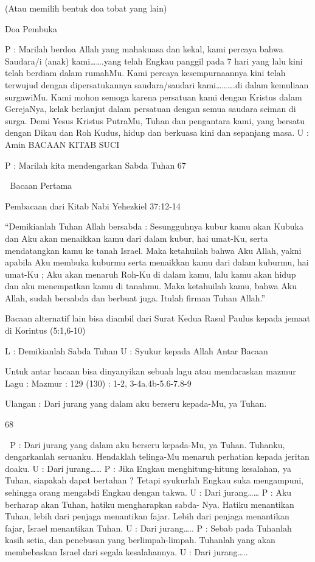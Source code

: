 \documentclass[10pt,a5paper,fancyhdr]{memoir}
\begin{document}
(Atau memilih bentuk doa tobat yang lain) 

Doa Pembuka 

P 
: Marilah berdoa 
Allah yang mahakuasa dan kekal, kami percaya bahwa 
Saudara/i (anak) kami…….yang telah Engkau panggil pada 
7 hari yang lalu kini telah berdiam dalam rumahMu. Kami 
percaya kesempurnaannya kini telah terwujud dengan 
dipersatukannya saudara/saudari kami……….di dalam 
kemuliaan surgawiMu. Kami mohon semoga karena 
persatuan kami dengan Kristus dalam GerejaNya, kelak 
berlanjut dalam persatuan dengan semua saudara seiman di 
surga. 
Demi Yesus Kristus PutraMu, Tuhan dan pengantara kami, 
yang bersatu dengan Dikau dan Roh Kudus, hidup dan 
berkuasa kini dan sepanjang masa. 
U 
: Amin 
BACAAN KITAB SUCI 

P 
: Marilah kita mendengarkan Sabda Tuhan 
67 



Bacaan Pertama 

Pembacaan dari Kitab Nabi Yehezkiel 37:12-14 

“Demikianlah Tuhan Allah bersabda : Sesungguhnya kubur 
kamu akan Kubuka dan Aku akan menaikkan kamu dari dalam 
kubur, hai umat-Ku, serta mendatangkan kamu ke tanah Israel. 
Maka ketahuilah bahwa Aku Allah, yakni apabila Aku 
membuka kuburmu serta menaikkan kamu dari dalam 
kuburmu, hai umat-Ku ; Aku akan menaruh Roh-Ku di dalam 
kamu, lalu kamu akan hidup dan aku menempatkan kamu di 
tanahmu. 
Maka ketahuilah kamu, bahwa Aku Allah, sudah bersabda dan 
berbuat juga. Itulah firman Tuhan Allah.” 

Bacaan alternatif lain bisa diambil dari Surat Kedua Rasul 
Paulus kepada jemaat di Korintus (5:1,6-10) 

L : Demikianlah Sabda Tuhan 
U : Syukur kepada Allah 
Antar Bacaan 

Untuk antar bacaan bisa dinyanyikan sebuah lagu atau 
mendaraskan mazmur 
Lagu : 
Mazmur : 129 (130) : 1-2, 3-4a.4b-5.6-7.8-9 

Ulangan : Dari jurang yang dalam aku berseru kepada-Mu, ya 
Tuhan. 

68 



P : Dari jurang yang dalam aku berseru kepada-Mu, ya 
Tuhan. Tuhanku, dengarkanlah seruanku. Hendaklah 
telinga-Mu menaruh perhatian kepada jeritan doaku. 
U : Dari jurang…… 
P : Jika Engkau menghitung-hitung kesalahan, ya Tuhan, 
siapakah dapat bertahan ? Tetapi syukurlah Engkau suka 
mengampuni, sehingga orang mengabdi Engkau dengan 
takwa. 
U : Dari jurang…… 
P : Aku berharap akan Tuhan, hatiku mengharapkan sabda-
Nya. Hatiku menantikan Tuhan, lebih dari penjaga 
menantikan fajar. Lebih dari penjaga menantikan fajar, 
Israel menantikan Tuhan. 
U : Dari jurang….. 
P : Sebab pada Tuhanlah kasih setia, dan penebusan yang 
berlimpah-limpah. Tuhanlah yang akan membebaskan 
Israel dari segala kesalahannya. 
U : Dari jurang….. 
\end{document}
